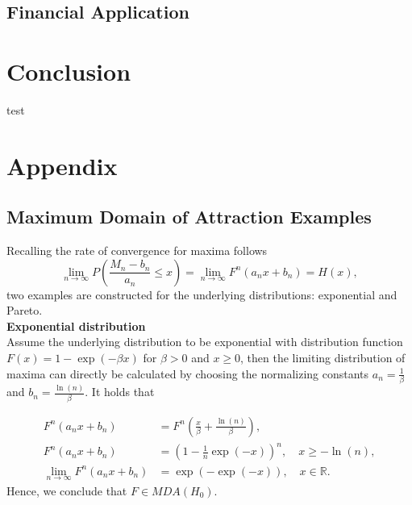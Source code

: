\documentclass[a4paper,12pt]{article}
\theoremstyle{plain}
\begin{document}
\newpage



\subsection{Financial Application}



\section{Conclusion}
test
\newpage



\newpage
\appendix
\section{Appendix}
\subsection{Maximum Domain of Attraction Examples}
\label{appendixA:maximumdomain}
Recalling the rate of convergence for maxima follows 
\begin{equation}
    \lim_{n\to\infty} P\left(\frac{M_n-b_n}{a_n}\leq x\right)=\lim_{n\to\infty}F^n\left(a_nx+b_n\right)=H\left(x\right),
\end{equation}
two examples are constructed for the underlying distributions: exponential and Pareto. \\

\noindent \textbf{Exponential distribution}\\
Assume the underlying distribution to be exponential with distribution function $F\left(x\right)=1-\exp{\left(-\beta x\right)}$ for $\beta>0$ and $x \geq 0$, then the limiting distribution of maxima can directly be calculated by choosing the normalizing constants $a_n = \frac{1}{\beta}$ and $b_n=\frac{\ln{\left(n\right)}}{\beta}$. It holds that

\begin{equation}
    \begin{split}
    F^n\left(a_nx+b_n\right) &= F^n\left(\frac{x}{\beta}+\frac{\ln{\left(n\right)}}{\beta}\right),\\
    F^n\left(a_nx+b_n\right) &= \left(1-\frac{1}{n}\exp{\left(-x\right)}\right)^n, \quad x\geq-\ln{\left(n\right)}, \\
    \lim_{n\to\infty}F^n\left(a_nx+b_n\right) &= \exp{\left(-\exp{\left(-x\right)}\right)}, \quad x \in \mathbb{R}.
    \end{split}
\end{equation}
Hence, we conclude that $F\in MDA\left(H_0\right)$.\\
\end{document}
